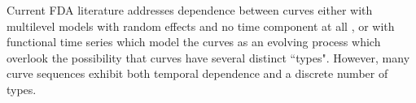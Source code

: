 

Current FDA literature addresses dependence between curves either with multilevel models with random effects and no time component at all \citep{Chen:2012,Di:2009}, or with functional time series which model the curves as an evolving process \citep{Kokoszka:2018} which overlook the possibility that curves have several distinct ``types". However, many curve sequences exhibit both temporal dependence and a discrete number of types. 



